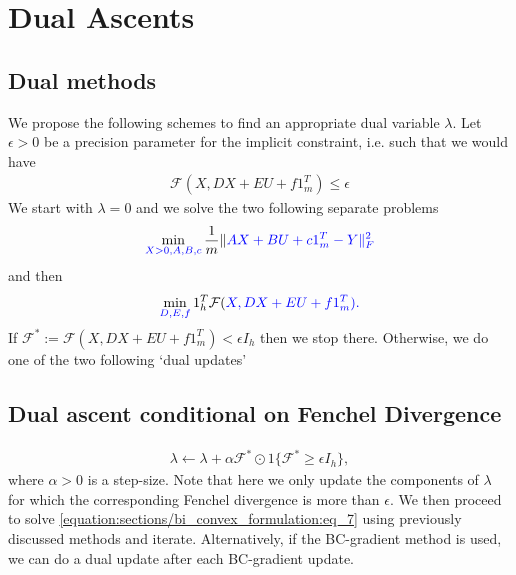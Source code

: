 \documentclass[letterpaper,10pt,english]{sphinxmanual}
\begin{document}
\chapter{Dual Ascents}
\label{\detokenize{sections/dual_ascents:dual-ascents}}\label{\detokenize{sections/dual_ascents:id1}}\label{\detokenize{sections/dual_ascents::doc}}

\section{Dual methods}
\label{\detokenize{sections/dual_ascents:dual-methods}}
We propose the following schemes to  find an appropriate dual variable \(\lambda\). Let \(\epsilon > 0\) be a precision parameter
for the implicit constraint, i.e. such that we would have
\begin{equation*}
\begin{split}\mathcal{F}(X,DX + EU + f1_m^T) \leq \epsilon\end{split}
\end{equation*}
We start with \(\lambda = 0\) and we solve the two following separate problems
\begin{equation*}
\begin{split}\min_{\color{blue}{X} > 0, \color{blue}{A}, \color{blue}{B}, \color{blue}{c}} \frac{1}{m} \Vert \color{blue}{AX} + \color{blue}{B}U + \color{blue}{c}1_m^T - Y \Vert_F^2\end{split}
\end{equation*}
and then
\begin{equation*}
\begin{split}\min_{\color{blue}{D}, \color{blue}{E}, \color{blue}{f}} 1_h^T\mathcal{F}(\color{blue}{X},\color{blue}{DX} + \color{blue}{E}U + \color{blue}{f}1_m^T).\end{split}
\end{equation*}
If \(\mathcal{F}^* := \mathcal{F}(X,DX + EU + f1_m^T) < \epsilon I_h\) then we stop there. Otherwise, we do one of the two following ‘dual
updates’


\section{Dual ascent conditional on Fenchel Divergence}
\label{\detokenize{sections/dual_ascents:dual-ascent-conditional-on-fenchel-divergence}}\begin{equation}\label{equation:sections/dual_ascents:eq_8}
\begin{split}\lambda \leftarrow \lambda + \alpha \mathcal{F}^* \odot 1\{\mathcal{F}^* \geq \epsilon I_h\},\end{split}
\end{equation}
where \(\alpha > 0\) is a step-size. Note that here we only update the components of \(\lambda\) for which the corresponding
Fenchel divergence is more than \(\epsilon\). We then proceed to solve \eqref{equation:sections/bi_convex_formulation:eq_7} using previously discussed methods and
iterate. Alternatively, if the BC-gradient method is used, we can do a dual update after each BC-gradient
update.
\end{document}
